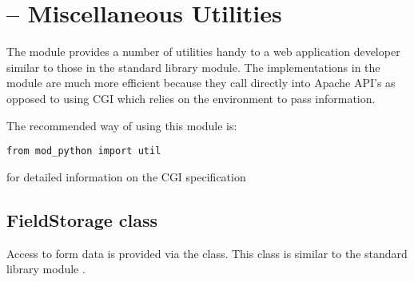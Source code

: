 \section{ -- Miscellaneous Utilities\label{pyapi-util}}

The  module provides a number of utilities handy to a web
application developer similar to those in the standard library
 module. The implementations in the  module
are much more efficient because they call directly into Apache API's
as opposed to using CGI which relies on the environment to pass
information.

The recommended way of using this module is:
\begin{verbatim}
from mod_python import util
\end{verbatim}

\begin{seealso}
	{for detailed information on the CGI specification}
\end{seealso}

\subsection{FieldStorage class\label{pyapi-util-fstor}}

Access to form data is provided via the 
class. This class is similar to the standard library module
 .

